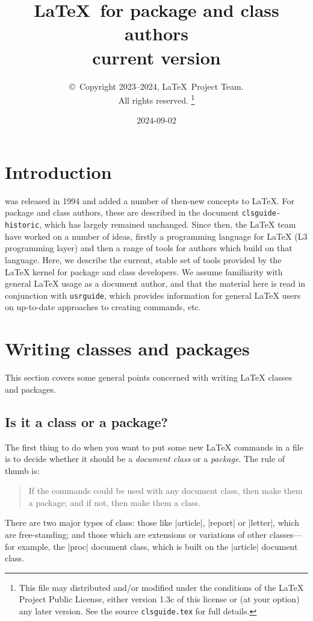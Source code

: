 \documentclass{ltxguide}
\title{\LaTeX\ for package and class authors\\current version}
\author{\copyright~Copyright 2023--2024, \LaTeX\ Project Team.\\
   All rights reserved.%
   \footnote{This file may distributed and/or modified under the
     conditions of the \LaTeX{} Project Public License, either version 1.3c
     of this license or (at your option) any later version. See the source
    \texttt{clsguide.tex} for full details.}%
}
\date{2024-09-02}
\begin{document}
\maketitle

\tableofcontents

\section{Introduction}

\LaTeXe{} was released in 1994 and added a number of then-new concepts to
\LaTeX{}. For package and class authors, these are described in the document
\texttt{clsguide-historic}, which has largely remained unchanged. Since then,
the \LaTeX{} team have worked on a number of ideas, firstly a programming
language for \LaTeX{} (L3 programming layer) and then a range of tools for
authors which build on that language. Here, we describe the current, stable set
of tools provided by the \LaTeX{} kernel for package and class developers. We
assume familiarity with general \LaTeX{} usage as a document author, and that
the material here is read in conjunction with \texttt{usrguide}, which provides
information for general \LaTeX{} users on up-to-date approaches to creating
commands, etc.

\section{Writing classes and packages}
\label{sec:writing}

This section covers some general points concerned with writing
\LaTeX{} classes and packages.

\subsection{Is it a class or a package?}
\label{sec:classorpkg}

The first thing to do when you want to put some new \LaTeX{} commands
in a file is to decide whether it should be a \emph{document class} or a
\emph{package}.  The rule of thumb is:
\begin{quote}
  If the commands could be used with any document class, then make
  them a package; and if not, then make them a class.
\end{quote}

There are two major types of class: those like |article|, |report| or
|letter|, which are free-standing; and those which are extensions or
variations of other classes---for example, the |proc| document class,
which is built on the |article| document class.
\end{document}
